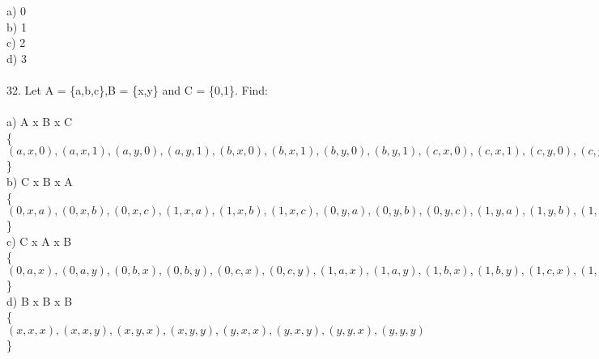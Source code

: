 \documentclass[11pt, oneside]{article}   	%
\begin{document}
a) 0\\
b) 1\\
c) 2\\
d) 3\\\\
32. Let A = \{a,b,c\},B = \{x,y\} and C = \{0,1\}. Find:\\\\
a) A x B x C\\
\{$(a,x,0),(a,x,1),(a,y,0),(a,y,1),(b,x,0),(b,x,1),(b,y,0),(b,y,1),(c,x,0),(c,x,1),(c,y,0),(c,y,1)$\}\\
b) C x B x A\\
\{$(0,x,a),(0,x,b),(0,x,c),(1,x,a),(1,x,b),(1,x,c),(0,y,a),(0,y,b),(0,y,c),(1,y,a),(1,y,b),(1,y,c)$\}\\
c) C x A x B\\
\{$(0,a,x),(0,a,y),(0,b,x),(0,b,y),(0,c,x),(0,c,y),(1,a,x),(1,a,y),(1,b,x),(1,b,y),(1,c,x),(1,c,y)$\}\\
d) B x B x B\\
\{$(x,x,x),(x,x,y),(x,y,x),(x,y,y),(y,x,x),(y,x,y),(y,y,x),(y,y,y)$\}\\
\end{document}
